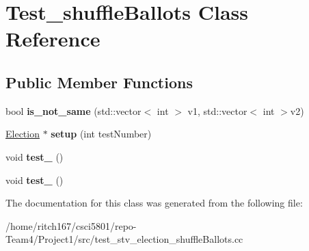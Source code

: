 \hypertarget{classTest__shuffleBallots}{}\section{Test\+\_\+shuffle\+Ballots Class Reference}
\label{classTest__shuffleBallots}
\subsection*{Public Member Functions}
\begin{DoxyCompactItemize}
\item 
\mbox{\label{classTest__shuffleBallots_a8219bf36f1278e504ef7d7e0cbff0f42}} 
bool {\bfseries is\+\_\+not\+\_\+same} (std\+::vector$<$ int $>$ v1, std\+::vector$<$ int $>$v2)
\item 
\mbox{\label{classTest__shuffleBallots_adc0aa80ebbf1a84aec7c6b61a6f2af82}} 
\hyperlink{classElection}{Election} $\ast$ {\bfseries setup} (int test\+Number)
\item 
\mbox{\label{classTest__shuffleBallots_aa3a6dd0533a2c6da3fd5aa57e87659ee}} 
void {\bfseries test\+\_} ()
\item 
\mbox{\label{classTest__shuffleBallots_a0f286cf2f36c9b0111a6e674ef8fe6a6}} 
void {\bfseries test\+\_} ()
\end{DoxyCompactItemize}


The documentation for this class was generated from the following file\+:\begin{DoxyCompactItemize}
\item 
/home/ritch167/csci5801/repo-\/\+Team4/\+Project1/src/test\+\_\+stv\+\_\+election\+\_\+shuffle\+Ballots.\+cc\end{DoxyCompactItemize}
